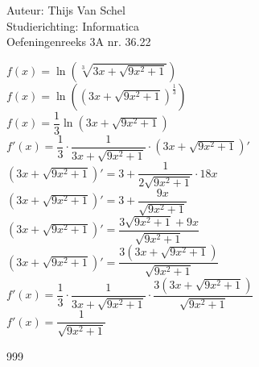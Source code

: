 \documentclass[a4paper]{article}
\begin{document}
  
\noindent \large Auteur: Thijs Van Schel\\
\noindent \large Studierichting: Informatica\\
\noindent \large Oefeningenreeks 3A nr. 36.22 \\

\medskip

\normalsize

$f(x) = \ln\left(\sqrt[3]{3x+\sqrt{9x^2+1}}\right)$\\

$f(x) = \ln\left(\left(3x+\sqrt{9x^2+1}\right)^{\tfrac{1}{3}}\right)$\\

$f(x) = \dfrac{1}{3} \ln\left(3x+\sqrt{9x^2+1}\right)$\\

$f'(x) = \dfrac{1}{3} \cdot \dfrac{1}{3x+\sqrt{9x^2+1}} \cdot \left(3x+\sqrt{9x^2+1}\right)'$\\

$\left(3x+\sqrt{9x^2+1}\right)' = 3 + \dfrac{1}{2\sqrt{9x^2+1}} \cdot 18x$\\

$\left(3x+\sqrt{9x^2+1}\right)' = 3 + \dfrac{9x}{\sqrt{9x^2+1}}$\\

$\left(3x+\sqrt{9x^2+1}\right)' = \dfrac{3\sqrt{9x^2+1} + 9x}{\sqrt{9x^2+1}}$\\

$\left(3x+\sqrt{9x^2+1}\right)' = \dfrac{3(3x + \sqrt{9x^2+1})}{\sqrt{9x^2+1}}$\\

$f'(x) = \dfrac{1}{3} \cdot \dfrac{1}{3x+\sqrt{9x^2+1}} \cdot \dfrac{3(3x + \sqrt{9x^2+1})}{\sqrt{9x^2+1}}$\\

$f'(x) = \dfrac{1}{\sqrt{9x^2+1}}$\\

\begin{thebibliography}{999}
\end{thebibliography}
\end{document}
